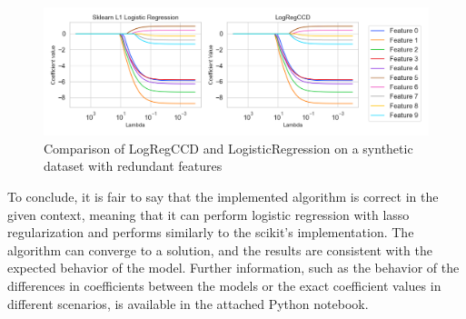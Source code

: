 \documentclass[11pt]{article}
\begin{document}
\begin{figure}[h]
    \centering
  \includegraphics[width=\textwidth]{../results/logistic_regression_l1_logregccd_coefficients_redundant_features.png}
    \caption{Comparison of LogRegCCD and LogisticRegression on a synthetic dataset with redundant features}
    \label{fig:comparison-synthetic-dataset-redundant-features}
  \end{figure}


To conclude, it is fair to say that the implemented algorithm is correct in the given context, meaning that it can perform logistic regression with lasso regularization and performs similarly to the scikit's implementation. The algorithm can converge to a solution, and the results are consistent with the expected behavior of the model. Further information, such as the behavior of the differences in coefficients between the models or the exact coefficient values in different scenarios, is available in the attached Python notebook.


\clearpage 
\listoffigures
\printbibliography
\end{document}
